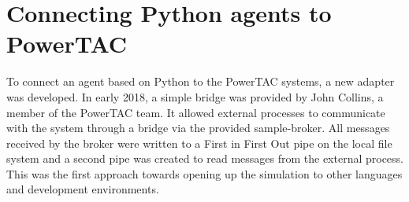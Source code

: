 
%
%


\section{Connecting Python agents to PowerTAC}%
\label{sec:connecting_python_agents_to_powertac}



To connect an agent based on Python to the \ac{PowerTAC} systems, a new adapter was developed. In early 2018, a simple bridge
was provided by John Collins, a member of the \ac{PowerTAC} team. It allowed external processes to communicate with the
system through a bridge via the provided sample-broker. All messages received by the broker were written to a First in
First Out pipe on the local file system and a second pipe was created to read messages from the external process. This
was the first approach towards opening up the simulation to other languages and development environments.


